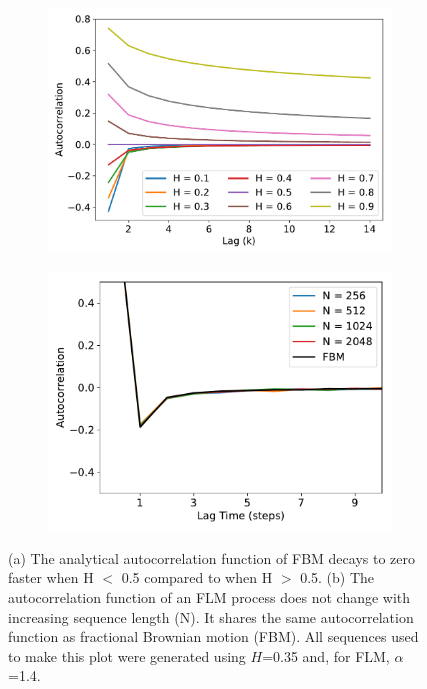 \documentclass{article}
\begin{document}
  \begin{figure}
  \centering
  \begin{subfigure}{0.45\textwidth}
  \includegraphics[width=\textwidth]{hurst_autocorrelation.pdf}
  \caption{}\label{fig:hurst_autocorrelation}
  \end{subfigure}
  \begin{subfigure}{0.45\textwidth}
  \includegraphics[width=\textwidth]{flm_autocovariance.pdf}
  \caption{}\label{fig:flm_autocorrelation}
  \end{subfigure}
  \caption{(a) The analytical autocorrelation function of FBM decays to zero faster
  when H $<$ 0.5 compared to when H $>$ 0.5. (b) The autocorrelation function of an 
  FLM process does not change with increasing sequence length (N). It shares the same
  autocorrelation function as fractional Brownian motion (FBM). All 
  sequences 
  used to
  make this plot were generated using $H$=0.35 and, for FLM, $\alpha$=1.4.}\label{fig:hurst_parameters}
  \end{figure}
  
\end{document}
